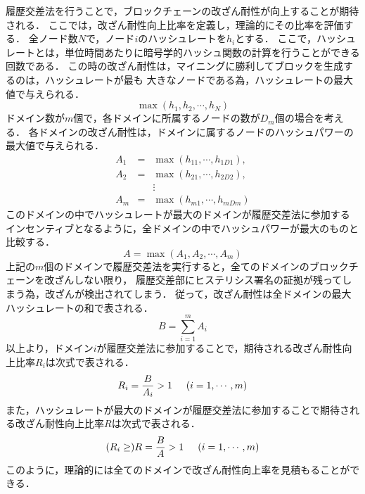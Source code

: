 \documentclass[a4paper,12pt]{jsarticle}
\begin{document}
履歴交差法を行うことで，ブロックチェーンの改ざん耐性が向上することが期待される．
ここでは，改ざん耐性向上比率を定義し，理論的にその比率を評価する．
全ノード数$N$で，ノード$i$のハッシュレートを$h_i$とする．
ここで，ハッシュレートとは，単位時間あたりに暗号学的ハッシュ関数の計算を行うことができる回数である．
この時の改ざん耐性は，マイニングに勝利してブロックを生成するのは，ハッシュレートが最も
大きなノードである為，ハッシュレートの最大値で与えられる．
%
\begin{equation}
  \max(h_1, h_2, \cdots, h_N)
\end{equation}
%
ドメイン数が$m$個で，各ドメインに所属するノードの数が$D_m$個の場合を考える．
各ドメインの改ざん耐性は，ドメインに属するノードのハッシュパワーの最大値で与えられる．
%
\begin{eqnarray}
	A_1 &=& \max (h_{11}, \cdots ,h_{1D1}), \\
	A_2 &=& \max(h_{21}, \cdots ,h_{2D2}), \\
	    & & \vdots \nonumber \\
	A_m &=& \max(h_{m1}, \cdots ,h_{mDm})
\end{eqnarray}
%
このドメインの中でハッシュレートが最大のドメインが履歴交差法に参加する
インセンティブとなるように，全ドメインの中でハッシュパワーが最大のものと比較する．
%
\begin{equation}
A = \max(A_1, A_2, \cdots, A_m)
\end{equation}
%
上記の$m$個のドメインで履歴交差法を実行すると，全てのドメインのブロックチェーンを改ざんしない限り，
履歴交差部にヒステリシス署名の証拠が残ってしまう為，改ざんが検出されてしまう．
従って，改ざん耐性は全ドメインの最大ハッシュレートの和で表される．
%
\begin{equation}
	B = \sum_{i=1}^{m} A_i
\end{equation}
%
以上より，ドメイン$i$が履歴交差法に参加することで，期待される改ざん耐性向上比率$R_i$は次式で表される．
%
\begin{equation}
	R_i = \frac{B}{A_i} > 1 \hspace{5mm} (i=1, \cdots, m)
\end{equation}
%
また，ハッシュレートが最大のドメインが履歴交差法に参加することで期待される改ざん耐性向上比率$R$は次式で表される．
%
\begin{equation}
	(R_i \ge) R = \frac{B}{A} > 1  \hspace{5mm} (i=1, \cdots, m)
\end{equation}
%
このように，理論的には全てのドメインで改ざん耐性向上率を見積もることができる．
\end{document}
